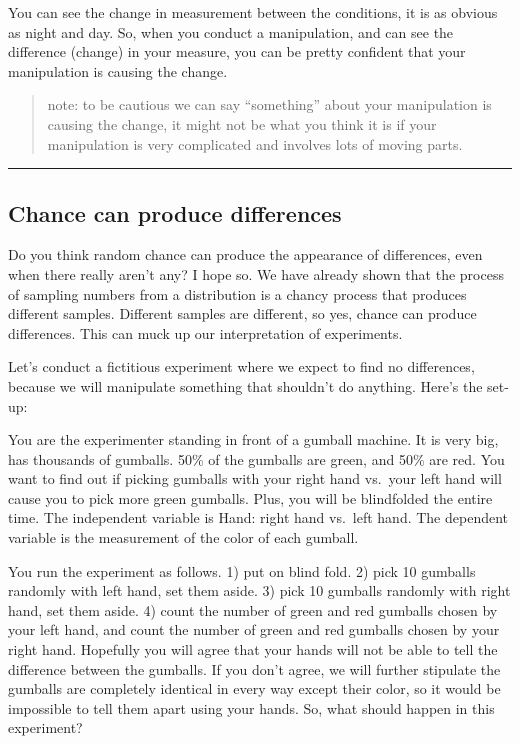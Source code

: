 \documentclass[
]{book}
\begin{document}
You can see the change in measurement between the conditions, it is as obvious as night and day. So, when you conduct a manipulation, and can see the difference (change) in your measure, you can be pretty confident that your manipulation is causing the change.

\begin{quote}
note: to be cautious we can say ``something'' about your manipulation is causing the change, it might not be what you think it is if your manipulation is very complicated and involves lots of moving parts.
\end{quote}

\begin{center}\rule{0.5\linewidth}{0.5pt}\end{center}

\hypertarget{chance-can-produce-differences}{%
\subsection{Chance can produce differences}\label{chance-can-produce-differences}}

Do you think random chance can produce the appearance of differences, even when there really aren't any? I hope so. We have already shown that the process of sampling numbers from a distribution is a chancy process that produces different samples. Different samples are different, so yes, chance can produce differences. This can muck up our interpretation of experiments.

Let's conduct a fictitious experiment where we expect to find no differences, because we will manipulate something that shouldn't do anything. Here's the set-up:

You are the experimenter standing in front of a gumball machine. It is very big, has thousands of gumballs. 50\% of the gumballs are green, and 50\% are red. You want to find out if picking gumballs with your right hand vs.~your left hand will cause you to pick more green gumballs. Plus, you will be blindfolded the entire time. The independent variable is Hand: right hand vs.~left hand. The dependent variable is the measurement of the color of each gumball.

You run the experiment as follows. 1) put on blind fold. 2) pick 10 gumballs randomly with left hand, set them aside. 3) pick 10 gumballs randomly with right hand, set them aside. 4) count the number of green and red gumballs chosen by your left hand, and count the number of green and red gumballs chosen by your right hand. Hopefully you will agree that your hands will not be able to tell the difference between the gumballs. If you don't agree, we will further stipulate the gumballs are completely identical in every way except their color, so it would be impossible to tell them apart using your hands. So, what should happen in this experiment?
\end{document}
